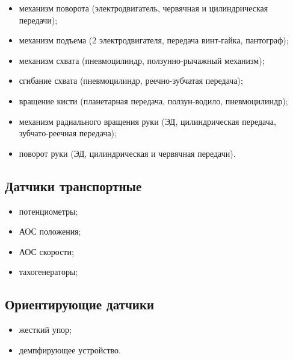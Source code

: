 \begin{itemize}
    \item механизм поворота (электродвигатель, червячная и цилиндрическая передачи);
    \item механизм подъема (2 электродвигателя, передача винт-гайка, пантограф);
    \item механизм схвата (пневмоцилиндр, ползунно-рычажный механизм);
    \item сгибание схвата (пневмоцилиндр, реечно-зубчатая передача);
    \item вращение кисти (планетарная передача, ползун-водило, пневмоцилиндр);
    \item механизм радиального вращения руки (ЭД, цилиндрическая передача, зубчато-реечная передача);
    \item поворот руки (ЭД, цилиндрическая и червячная передачи).
\end{itemize}

\subsection*{Датчики транспортные}

\begin{itemize}
    \item потенциометры;
    \item АОС положения;
    \item АОС скорости;
    \item тахогенераторы;
\end{itemize}

\subsection*{Ориентирующие датчики}

\begin{itemize}
    \item жесткий упор;
    \item демпфирующее устройство.
\end{itemize}
